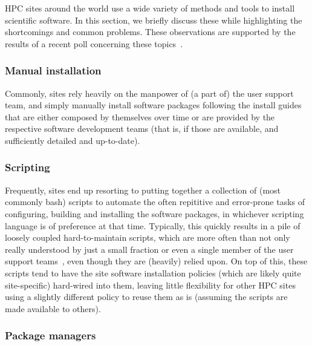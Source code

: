 HPC sites around the world use a wide variety of methods and tools to
install scientific software. In this section, we briefly discuss these while
highlighting the shortcomings and common problems. These observations are
supported by the results of a recent poll concerning these
topics~\cite{ISC14bof}.

\subsubsection{Manual installation}

Commonly, sites rely heavily on the manpower of (a part of)
the user support team, and simply manually install software packages following
the install guides that are either composed by themselves over time or are provided
by the respective software development teams (that is, if those are available, and
sufficiently detailed and up-to-date).

\subsubsection{Scripting}

Frequently, sites end up resorting to putting together a collection of (most
commonly bash) scripts to automate the often repititive and error-prone tasks of
configuring, building and installing the software packages, in whichever scripting
language is of preference at that time. Typically, this quickly results in a pile of
loosely coupled hard-to-maintain scripts, which are more often than not only really
understood by just a small fraction or even a single member of the user support
teams~\cite{Jim}, even though they are (heavily) relied upon. On top of this, these
scripts tend to have the site software installation policies (which are likely quite
site-specific) hard-wired into them, leaving little flexibility for other HPC
sites using a slightly different policy to reuse them as is (assuming the scripts
are made available to others).

\subsubsection{Package managers}

